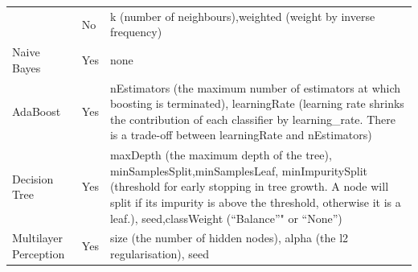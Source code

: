 \documentclass[]{article}
\begin{document}
\begin{longtable}[]{@{}lll@{}}
\begin{minipage}[t]{0.35\columnwidth}
\end{minipage} & \begin{minipage}[t]{0.08\columnwidth}\raggedright\strut
No\strut
\end{minipage} & \begin{minipage}[t]{0.48\columnwidth}\raggedright\strut
k (number of neighbours),weighted (weight by inverse frequency)\strut
\end{minipage}\tabularnewline
\begin{minipage}[t]{0.35\columnwidth}\raggedright\strut
Naive Bayes\strut
\end{minipage} & \begin{minipage}[t]{0.08\columnwidth}\raggedright\strut
Yes\strut
\end{minipage} & \begin{minipage}[t]{0.48\columnwidth}\raggedright\strut
none\strut
\end{minipage}\tabularnewline
\begin{minipage}[t]{0.35\columnwidth}\raggedright\strut
AdaBoost\strut
\end{minipage} & \begin{minipage}[t]{0.08\columnwidth}\raggedright\strut
Yes\strut
\end{minipage} & \begin{minipage}[t]{0.48\columnwidth}\raggedright\strut
nEstimators (the maximum number of estimators at which boosting is
terminated), learningRate (learning rate shrinks the contribution of
each classifier by learning\_rate. There is a trade-off between
learningRate and nEstimators)\strut
\end{minipage}\tabularnewline
\begin{minipage}[t]{0.35\columnwidth}\raggedright\strut
Decision Tree\strut
\end{minipage} & \begin{minipage}[t]{0.08\columnwidth}\raggedright\strut
Yes\strut
\end{minipage} & \begin{minipage}[t]{0.48\columnwidth}\raggedright\strut
maxDepth (the maximum depth of the tree),
minSamplesSplit,minSamplesLeaf, minImpuritySplit (threshold for early
stopping in tree growth. A node will split if its impurity is above the
threshold, otherwise it is a leaf.), seed,classWeight (``Balance''" or
``None'')\strut
\end{minipage}\tabularnewline
\begin{minipage}[t]{0.35\columnwidth}\raggedright\strut
Multilayer Perception\strut
\end{minipage} & \begin{minipage}[t]{0.08\columnwidth}\raggedright\strut
Yes\strut
\end{minipage} & \begin{minipage}[t]{0.48\columnwidth}\raggedright\strut
size (the number of hidden nodes), alpha (the l2 regularisation),
seed\strut
\end{minipage}\tabularnewline
\bottomrule
\end{longtable}
\end{document}
